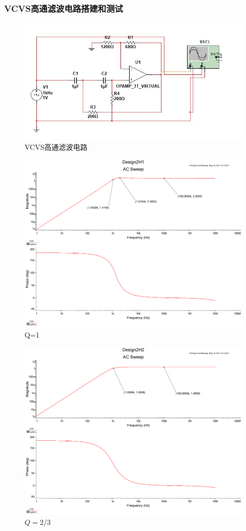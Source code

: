 \documentclass[UTF8,a4paper]{paper}
\begin{document}
\subsubsection{VCVS高通滤波电路搭建和测试}
\begin{figure}
\centering
\includegraphics[width=\textwidth]{H.jpg}
\caption{VCVS高通滤波电路}
\label{H}
\end{figure}
\begin{figure}
\centering
\includegraphics[width=\textwidth]{2H1.pdf}
\caption{Q=1}
\label{HQ1}
\end{figure}
\begin{figure}
\centering
\includegraphics[width=\textwidth]{2H2_3.pdf}
\caption{$Q=2/3$}
\label{HQ23}
\end{figure}
\end{document}
